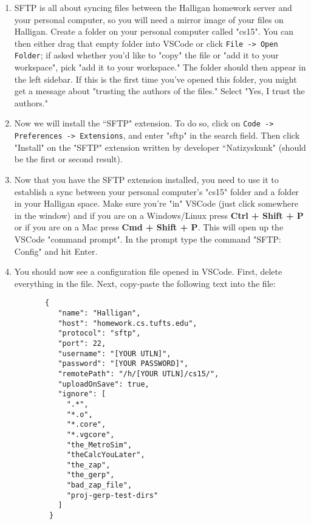 \documentclass[12pt]{article}
\begin{document}
\begin{enumerate}
\item
SFTP is all about syncing files between the Halligan homework server and your personal computer, so you will need a mirror image of your files on Halligan. Create a folder on your personal computer called "cs15". You can then either drag that empty folder into VSCode or click \texttt{File -> Open Folder}; if asked whether you'd like to "copy" the file or "add it to your workspace", pick "add it to your workspace." The folder should then appear in the left sidebar. If this is the first time you've opened this folder, you might get a message about "trusting the authors of the files." Select "Yes, I trust the authors."

\item
Now we will install the ``SFTP" extension. To do so, click on \texttt{Code -> Preferences -> Extensions}, and enter "sftp" in the search field. Then click "Install" on the "SFTP" extension written by developer ``Natizyskunk" (should be the first or second result).

\item
Now that you have the SFTP extension installed, you need to use it to establish a sync between your personal computer's "cs15" folder and a folder in your Halligan space. Make sure you're "in" VSCode (just click somewhere in the window) and if you are on a Windows/Linux press \textbf{Ctrl + Shift + P} or if you are on a Mac press \textbf{Cmd + Shift + P}. This will open up the VSCode "command prompt". In the prompt type the command "SFTP: Config" and hit Enter.

\item
You should now see a configuration file opened in VSCode. First, delete everything in the file. Next, copy-paste the following text into the file:
\begin{verbatim}
       {
          "name": "Halligan",
          "host": "homework.cs.tufts.edu",
          "protocol": "sftp",
          "port": 22,
          "username": "[YOUR UTLN]",
          "password": "[YOUR PASSWORD]",
          "remotePath": "/h/[YOUR UTLN]/cs15/",
          "uploadOnSave": true,
          "ignore": [
            ".*",
            "*.o",
            "*.core",
            "*.vgcore",
            "the_MetroSim",
            "theCalcYouLater",
            "the_zap",
            "the_gerp",
            "bad_zap_file",
            "proj-gerp-test-dirs"
          ]
        }
\end{verbatim}


\end{enumerate}
\end{document}
